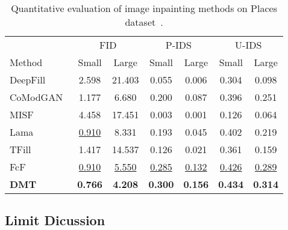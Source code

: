 \documentclass[10pt,twocolumn,letterpaper]{article}
\begin{document}
\begin{table}[t]
\small
\caption{Quantitative evaluation of image inpainting methods on Places dataset~\cite{places2}.}
\label{tab:main_places2}
\centering
\setlength{\tabcolsep}{2.8pt}
\begin{tabular}{lcccccc}
\toprule 
            & \multicolumn{2}{c}{FID} & \multicolumn{2}{c}{P-IDS} & \multicolumn{2}{c}{U-IDS} \\ 
Method      & Small            & \multicolumn{1}{c|}{Large}            & Small            & \multicolumn{1}{c|}{Large}            & Small            & Large            \\ \cmidrule(r){1-1} \cmidrule(r){2-3} \cmidrule(r){4-5} \cmidrule{6-7}
DeepFill~\cite{yu19free}    & 2.598           & 21.403          & 0.055           & 0.006           & 0.304           & 0.098 \\
CoModGAN~\cite{zhao21comod}    & 1.177           & 6.680           & 0.200           & 0.087           & 0.396           & 0.251           \\
MISF~\cite{li22misf}        & 4.458           & 17.451          & 0.003           & 0.001           & 0.126           & 0.064           \\
Lama~\cite{suvorov22lama}        & \underline{0.910}           & 8.331           & 0.193           & 0.045           & 0.402           & 0.219           \\
TFill~\cite{zheng22tfill}       & 1.417           & 14.537          & 0.126           & 0.021           & 0.361           & 0.159           \\
FcF~\cite{jain22fcf}         & \underline{0.910}           & \underline{5.550}           & \underline{0.285}           & \underline{0.132}           & \underline{0.426}           & \underline{0.289}           \\
\textbf{DMT} & \textbf{0.766}  & \textbf{4.208}  & \textbf{0.300}  & \textbf{0.156}  & \textbf{0.434}  & \textbf{0.314}  \\
\bottomrule         
\end{tabular}
\end{table}



\subsection{Limit Dicussion}
\end{document}
